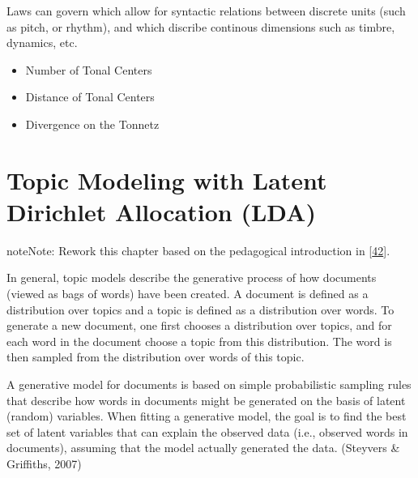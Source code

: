 \documentclass[letterpaper,10pt,english]{sphinxmanual}
\begin{document}
\sphinxAtStartPar
Laws can govern  which allow for syntactic relations
between discrete units (such as pitch, or rhythm), and  which discribe continous dimensions such as timbre,
dynamics, etc.

\sphinxAtStartPar
{}
\begin{itemize}
\item {} 
\sphinxAtStartPar
Number of Tonal Centers

\item {} 
\sphinxAtStartPar
Distance of Tonal Centers

\item {} 
\sphinxAtStartPar
Divergence on the Tonnetz

\end{itemize}


\chapter{Topic Modeling with Latent Dirichlet Allocation (LDA)}
\label{\detokenize{topic_modeling:topic-modeling-with-latent-dirichlet-allocation-lda}}\label{\detokenize{topic_modeling::doc}}
\begin{sphinxadmonition}{note}{Note:}
\sphinxAtStartPar
Rework this chapter based on the pedagogical introduction
in {[}\hyperlink{cite.8_bibliography:id15}{42}{]}.
\end{sphinxadmonition}

\sphinxAtStartPar
{}

\sphinxAtStartPar
In general, topic models describe the generative process of how
documents (viewed as bags of words) have been created. A document is
defined as a distribution over topics and a topic is defined as a
distribution over words. To generate a new document, one first chooses a
distribution over topics, and for each word in the document choose a
topic from this distribution. The word is then sampled from the
distribution over words of this topic.

\sphinxAtStartPar
A generative model for documents is based on simple probabilistic
sampling rules that describe how words in documents might be
generated on the basis of latent (random) variables. When fitting a
generative model, the goal is to find the best set of latent
variables that can explain the observed data (i.e., observed words
in documents), assuming that the model actually generated the data.
(Steyvers \& Griffiths, 2007)
\end{document}
